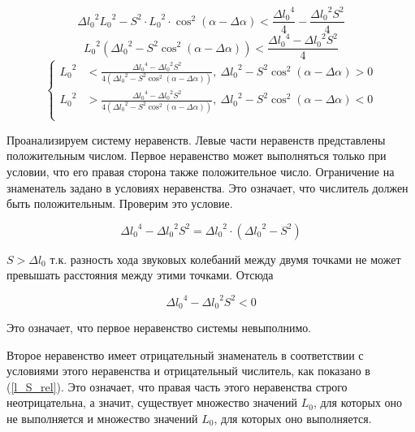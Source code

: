 \documentclass[fleqn,10pt,a4paper]{article}
\begin{document}
\begin{equation*}
	{\Delta{}l_0}^2{L_0}^2-S^2\cdot{}{L_0}^2\cdot\cos^2\left(\alpha -
	\Delta\alpha\right) < \frac{{\Delta{}l_0}^4}{4} - \frac{{\Delta{}l_0}^2S^2}{4}
\end{equation*}
\begin{equation*}
	{L_0}^2\left({\Delta{}l_0}^2-S^2\cos^2\left(\alpha -
	\Delta\alpha\right)\right)
	< \frac{{\Delta{}l_0}^4 - {\Delta{}l_0}^2S^2}{4}
\end{equation*}
\begin{equation*}
	\left\{
		\begin{aligned}
			{L_0}^2 &< 
			\frac{{\Delta{}l_0}^4 - {\Delta{}l_0}^2S^2}{4\left({\Delta{}l_0}^2-
			S^2\cos^2\left(\alpha - \Delta\alpha\right)\right)},~
			{\Delta{}l_0}^2-S^2\cos^2\left(\alpha - \Delta\alpha\right)>0
			\\
			{L_0}^2 &>
			\frac{{\Delta{}l_0}^4 - {\Delta{}l_0}^2S^2}{4\left({\Delta{}l_0}^2-
			S^2\cos^2\left(\alpha - \Delta\alpha\right)\right)},~
			{\Delta{}l_0}^2-S^2\cos^2\left(\alpha - \Delta\alpha\right)<0
			\\
		\end{aligned}
	\right.
\end{equation*}

Проанализируем систему неравенств. Левые части неравенств представлены
положительным числом. Первое неравенство может выполняться только при условии,
что его правая сторона также положительное число. Ограничение на знаменатель
задано в условиях неравенства. Это означает, что числитель должен быть 
положительным. Проверим это условие.

\begin{equation*}
	{\Delta{}l_0}^4 - {\Delta{}l_0}^2S^2 =
	{\Delta{}l_0}^2\cdot\left({\Delta{}l_0}^2-S^2\right)
\end{equation*}

$S>\Delta{}l_0$ т.к. разность хода звуковых колебаний между двумя точками не
может превышать расстояния между этими точками. Отсюда

\begin{equation}
	\boxed{
		{\Delta{}l_0}^4-{\Delta{}l_0}^2S^2<0
	}\label{l_S_rel}
\end{equation}

Это означает, что первое неравенство системы невыполнимо.

Второе неравенство имеет отрицательный знаменатель в соответствии с условиями
этого неравенства и отрицательный числитель, как показано в (\ref{l_S_rel}). Это
означает, что правая часть этого неравенства строго неотрицательна, а значит,
существует множество значений $L_0$, для которых оно не выполняется и множество
значений $L_0$, для которых оно выполняется.
\end{document}

